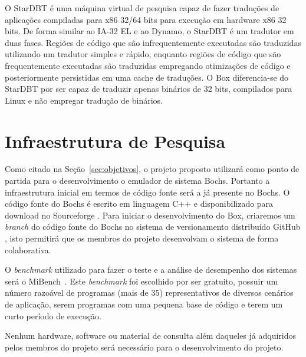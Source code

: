 \documentclass[11pt,twoside]{article}
\begin{document}
O StarDBT \cite{Wang2007} é uma máquina virtual de pesquisa capaz de fazer traduções de 
aplicações compiladas para x86 32/64 bits para execução em hardware x86 32 bits. De 
forma similar ao IA-32 EL e ao Dynamo, o StarDBT é um tradutor em duas fases. Regiões 
de código que são infrequentemente executadas são traduzidas utilizando um tradutor 
simples e rápido, enquanto regiões de código que são frequentemente executadas são 
traduzidas empregando otimizações de código e posteriormente persistidas em uma cache 
de traduções. O Box diferencia-se do StarDBT por ser capaz de traduzir apenas binários 
de 32 bits, compilados para Linux e não empregar tradução de binários.





\section{Infraestrutura de Pesquisa} \label{sec:infraestrutura}

Como citado na Seção~\ref{sec:objetivos}, o projeto proposto utilizará como
ponto de partida para o desenvolvimento o emulador de sistema Bochs. Portanto 
a infraestrutura inicial em termos de código fonte será a já presente no Bochs. 
O código fonte do Bochs é escrito em linguagem C++ e disponibilizado para download
no Sourceforge \cite{bochs_site}. Para iniciar o desenvolvimento do Box, criaremos
um \emph{branch} do código fonte do Bochs no sistema de versionamento distribuído
GitHub \cite{github}, isto permitirá que os membros do projeto desenvolvam o sistema
de forma colaborativa.

O \textit{benchmark} utilizado para fazer o teste e a análise de desempenho dos sistemas será
o MiBench~\cite{Guthaus2001}. Este \textit{benchmark} foi escolhido por ser gratuito, possuir
um número razoável de programas (mais de 35) representativos de diversos cenários de 
aplicação, serem programas com uma pequena base de código e terem um curto período
de execução.

Nenhum hardware, software ou material de consulta além daqueles já adquiridos 
pelos membros do projeto será necessário para o desenvolvimento do projeto.
\end{document}
